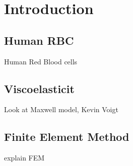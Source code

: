 \documentclass[Thesis_main]{subfiles}
\begin{document}
	\section{Introduction}
	\subsection{Human RBC}
	
	
	Human Red Blood cells
	\subsection{Viscoelasticit}
	Look at Maxwell model, Kevin Voigt
	
	\subsection{Finite Element Method}
	explain FEM
\end{document}
